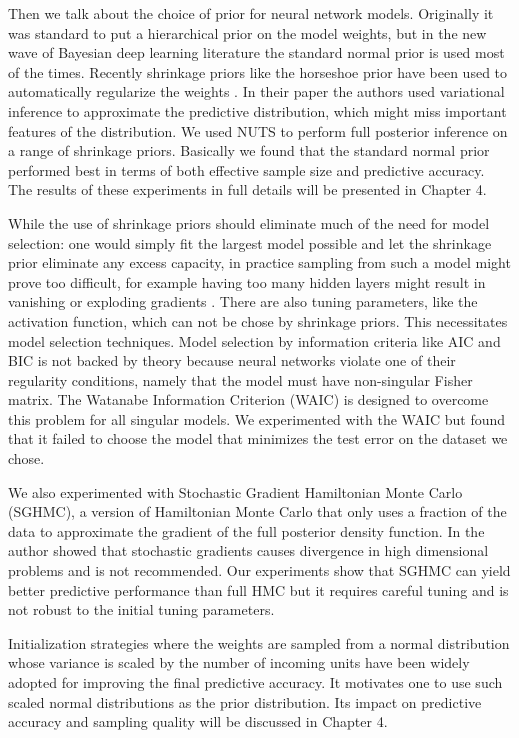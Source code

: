 \documentclass[12pt]{report}
\begin{document}
Then we talk about the choice of prior for neural network models. Originally it was standard to put a hierarchical prior on the model weights, but in the new wave of Bayesian deep learning literature the standard normal prior is used most of the times. Recently shrinkage priors like the horseshoe prior have been used to automatically regularize the weights \cite{ghosh2017model}. In their paper the authors used variational inference to approximate the predictive distribution, which might miss important features of the  distribution. We used NUTS to perform full posterior inference on a range of shrinkage priors. Basically we found that the standard normal prior performed best in terms of both effective sample size and predictive accuracy. The results of these experiments in full details will be presented in Chapter 4.

While the use of shrinkage priors should eliminate much of the need for model selection: one would simply fit the largest model possible and let the shrinkage prior eliminate any excess capacity, in practice sampling from such a model might prove too difficult, for example having too many hidden layers might result in vanishing or exploding gradients \cite{bengio1994learning}. There are also tuning parameters, like the activation function, which can not be chose by shrinkage priors. This necessitates model selection techniques. Model selection by information criteria like AIC and BIC is not backed by theory because neural networks violate one of their regularity conditions, namely that the model must have non-singular Fisher matrix. The Watanabe Information Criterion (WAIC) is designed to overcome this problem for all singular models. We experimented with the WAIC but found that it failed to choose the model that minimizes the test error on the dataset we chose. 

We also experimented with Stochastic Gradient Hamiltonian Monte Carlo (SGHMC), a version of Hamiltonian Monte Carlo that only uses a fraction of the data to approximate the gradient of the full posterior density function. In \cite{betancourt2015fundamental} the author showed that stochastic gradients causes divergence in high dimensional problems and is not recommended. Our experiments show that SGHMC can yield better predictive performance than full HMC but it requires careful tuning and is not robust to the initial tuning parameters. 

Initialization strategies where the weights are sampled from a normal distribution whose variance is scaled by the number of incoming units have been widely adopted for improving the final predictive accuracy. It motivates one to use such scaled normal distributions as the prior distribution. Its impact on predictive accuracy and sampling quality will be discussed in Chapter 4. 
\end{document}
